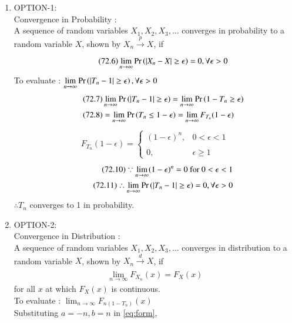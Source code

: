 \documentclass[journal,12pt,twocolumn]{IEEEtran}
\begin{document}
\begin{enumerate}
\item OPTION-1:\\
Convergence in Probability :\\
A sequence of random variables $X_{1},X_{2},X_{3},\dots$ converges in probability to a random variable $X$, shown by $X_{n}\xrightarrow[]{p}X$, if
\begin{align}
\tag{72.6}
    \displaystyle\lim_{n\to\infty}\Pr\left(|X_{n}-X|\geq\epsilon\right)=0,\forall\epsilon>0
\end{align}
To evaluate : $\displaystyle\lim_{n\to\infty}\Pr\left(|T_{n}-1|\geq\epsilon\right),\forall\epsilon>0$
\begin{align}
\tag{72.7}
    &\displaystyle\lim_{n\to\infty}\Pr\left(|T_{n}-1|\geq\epsilon\right)=\displaystyle\lim_{n\to\infty}\Pr\left(1-T_{n}\geq\epsilon\right)\\
\tag{72.8}
    &=\displaystyle\lim_{n\to\infty}\Pr\left(T_{n}\leq1-\epsilon\right)=\displaystyle\lim_{n\to\infty}F_{T_{n}}(1-\epsilon)
\end{align}
\begin{align}
\tag{72.9}
    F_{T_{n}}(1-\epsilon)=\begin{cases}
	(1-\epsilon)^{n}, & 0< \epsilon<1 \\~\\[-1em]
	0, & \epsilon\geq 1
	\end{cases}
\end{align}
\begin{align}
\tag{72.10}
    \because\displaystyle\lim_{n\to\infty}(1-\epsilon)^{n}=0 \text{ for } 0< \epsilon<1\\
    \tag{72.11}
    \therefore \displaystyle\lim_{n\to\infty}\Pr\left(|T_{n}-1|\geq\epsilon\right)=0,\forall\epsilon>0
\end{align}
$\therefore T_{n}$ converges to 1 in probability.
\item OPTION-2:\\
Convergence in Distribution :\\
A sequence of random variables $X_{1},X_{2},X_{3},\dots$ converges in distribution to a random variable $X$, shown by $X_{n}\xrightarrow[]{d}X$, if
\begin{align}
\tag{72.12}
    \displaystyle\lim_{n\to\infty}F_{X_{n}}(x)=F_{X}(x)
\end{align}
for all $x$ at which $F_{X}(x)$ is continuous.\\
To evaluate : $\displaystyle\lim_{n\to\infty}F_{n(1-T_{n})}(x)$\\ 
Substituting $a=-n,b=n$ in \eqref{eq:form},
\begin{align}

\end{align}
\end{enumerate}
\end{document}
